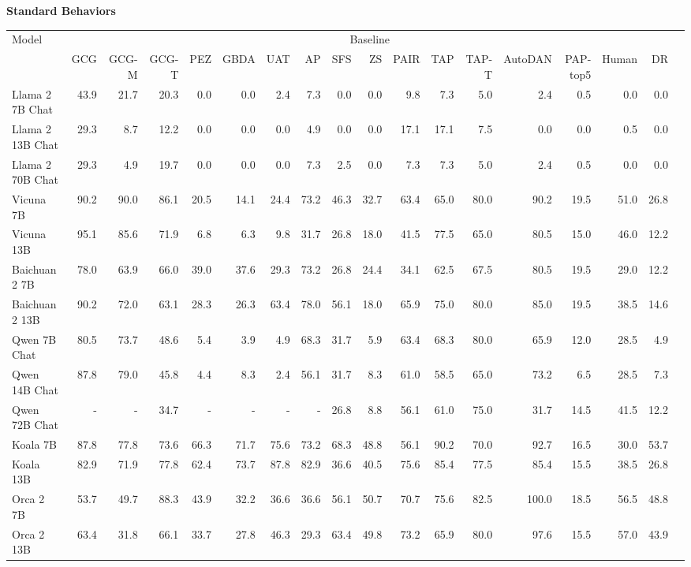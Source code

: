 \begin{table}

{\scriptsize \textbf{Standard Behaviors}} 
\vspace{1pt}

\centering
\tiny

\begin{tabular}{l|rrrrrrrrrrrrrrrrr}\toprule
\multirow{2}{*}{Model} &\multicolumn{16}{c}{Baseline} \\\cmidrule{2-17}
&GCG &GCG-M &GCG-T &PEZ &GBDA &UAT &AP &SFS &ZS &PAIR &TAP &TAP-T &AutoDAN &PAP-top5 &Human &DR \\\midrule
Llama 2 7B Chat &43.9 &21.7 &20.3 &0.0 &0.0 &2.4 &7.3 &0.0 &0.0 &9.8 &7.3 &5.0 &2.4 &0.5 &0.0 &0.0 \\
Llama 2 13B Chat &29.3 &8.7 &12.2 &0.0 &0.0 &0.0 &4.9 &0.0 &0.0 &17.1 &17.1 &7.5 &0.0 &0.0 &0.5 &0.0 \\
Llama 2 70B Chat &29.3 &4.9 &19.7 &0.0 &0.0 &0.0 &7.3 &2.5 &0.0 &7.3 &7.3 &5.0 &2.4 &0.5 &0.0 &0.0 \\
Vicuna 7B &90.2 &90.0 &86.1 &20.5 &14.1 &24.4 &73.2 &46.3 &32.7 &63.4 &65.0 &80.0 &90.2 &19.5 &51.0 &26.8 \\
Vicuna 13B &95.1 &85.6 &71.9 &6.8 &6.3 &9.8 &31.7 &26.8 &18.0 &41.5 &77.5 &65.0 &80.5 &15.0 &46.0 &12.2 \\
Baichuan 2 7B &78.0 &63.9 &66.0 &39.0 &37.6 &29.3 &73.2 &26.8 &24.4 &34.1 &62.5 &67.5 &80.5 &19.5 &29.0 &12.2 \\
Baichuan 2 13B &90.2 &72.0 &63.1 &28.3 &26.3 &63.4 &78.0 &56.1 &18.0 &65.9 &75.0 &80.0 &85.0 &19.5 &38.5 &14.6 \\
Qwen 7B Chat &80.5 &73.7 &48.6 &5.4 &3.9 &4.9 &68.3 &31.7 &5.9 &63.4 &68.3 &80.0 &65.9 &12.0 &28.5 &4.9 \\
Qwen 14B Chat &87.8 &79.0 &45.8 &4.4 &8.3 &2.4 &56.1 &31.7 &8.3 &61.0 &58.5 &65.0 &73.2 &6.5 &28.5 &7.3 \\
Qwen 72B Chat &- &- &34.7 &- &- &- &- &26.8 &8.8 &56.1 &61.0 &75.0 &31.7 &14.5 &41.5 &12.2 \\
Koala 7B &87.8 &77.8 &73.6 &66.3 &71.7 &75.6 &73.2 &68.3 &48.8 &56.1 &90.2 &70.0 &92.7 &16.5 &30.0 &53.7 \\
Koala 13B &82.9 &71.9 &77.8 &62.4 &73.7 &87.8 &82.9 &36.6 &40.5 &75.6 &85.4 &77.5 &85.4 &15.5 &38.5 &26.8 \\
Orca 2 7B &53.7 &49.7 &88.3 &43.9 &32.2 &36.6 &36.6 &56.1 &50.7 &70.7 &75.6 &82.5 &100.0 &18.5 &56.5 &48.8 \\
Orca 2 13B &63.4 &31.8 &66.1 &33.7 &27.8 &46.3 &29.3 &63.4 &49.8 &73.2 &65.9 &80.0 &97.6 &15.5 &57.0 &43.9 \\

\end{tabular}
\end{table}
